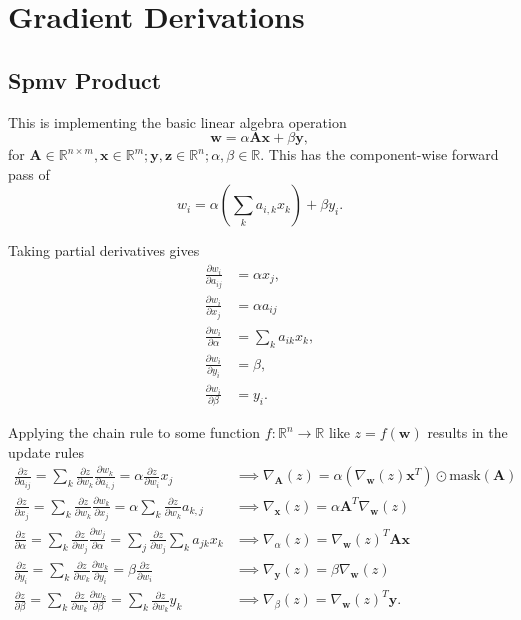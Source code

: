 \documentclass{article}
\newcommand{\mat}[1]{\bm{{#1}}}
\renewcommand{\vec}[1]{\bm{{#1}}}
\newcommand{\grad}{\nabla}
\newcommand{\mask}[1]{\text{mask}\left( {#1} \right)}
\newcommand{\gradfn}[2]{\nabla_{{#1}}\left({#2}\right)} %
\theoremstyle{definition}
\begin{document}
\section{Gradient Derivations}
\subsection{Spmv Product}
This is implementing the basic linear algebra operation
\begin{equation}
  \vec{w} = \alpha \mat{A}\vec{x} + \beta \vec{y},
\end{equation}
for $\mat{A} \in \mathbb{R}^{n \times m}, \vec{x} \in \mathbb{R}^m; \vec{y}, \vec{z} \in \mathbb{R}^n; \alpha, \beta \in \mathbb{R}$.  This has the component-wise forward pass of
\begin{equation}
  w_i = \alpha\left(\sum_k a_{i,k} x_k\right) + \beta y_i.
\end{equation}

Taking partial derivatives gives
\begin{align}
  \frac{\partial w_i}{\partial a_{ij}} &= \alpha x_j, \\
  \frac{\partial w_i}{\partial x_j} &= \alpha a_{ij} \\
  \frac{\partial w_i}{\partial \alpha} &= \sum_k a_{ik} x_k, \\
  \frac{\partial w_i}{\partial y_i} &= \beta, \\
  \frac{\partial w_i}{\partial \beta} &= y_i.
\end{align}

Applying the chain rule to some function $f : \mathbb{R}^n \to \mathbb{R}$ like $z=f\left(\vec{w}\right)$ results in the update rules
\begin{align}
  \frac{\partial z}{\partial a_{ij}} = \sum_k \frac{\partial z}{\partial w_k} \frac{\partial w_k}{\partial a_{i,j}} = \alpha \frac{\partial z}{\partial w_i} x_j &\implies \gradfn{\mat{A}}{z} = \alpha\left(\gradfn{\vec{w}}{z} \vec{x}^T\right) \odot \mask{\mat{A}} \\
  \frac{\partial z}{\partial x_j} = \sum_k \frac{\partial z}{\partial w_k} \frac{\partial w_k}{\partial x_j} = \alpha \sum_k \frac{\partial z}{\partial w_k} a_{k, j} &\implies \gradfn{\vec{x}}{z} = \alpha \mat{A}^T \grad_{\vec{w}}\left(z\right) \\
  \frac{\partial z}{\partial \alpha} = \sum_k \frac{\partial z}{\partial w_j} \frac{\partial w_j}{\partial \alpha} = \sum_j \frac{\partial z}{\partial w_j} \sum_k a_{jk} x_k &\implies \gradfn{\alpha}{z} = \gradfn{\vec{w}}{z}^T \mat{A} \vec{x} \\
  \frac{\partial z}{\partial y_i} = \sum_k \frac{\partial z}{\partial w_k} \frac{\partial w_k}{\partial y_i} = \beta \frac{\partial z}{\partial w_i} &\implies \gradfn{\vec{y}}{z} = \beta \gradfn{\vec{w}}{z} \\
  \frac{\partial z}{\partial \beta} = \sum_k \frac{\partial z}{\partial w_k} \frac{\partial w_k}{\partial \beta} = \sum_k \frac{\partial z}{\partial w_k} y_k &\implies \gradfn{\beta}{z} = \gradfn{\vec{w}}{z}^T \vec{y}.
\end{align}
\end{document}
